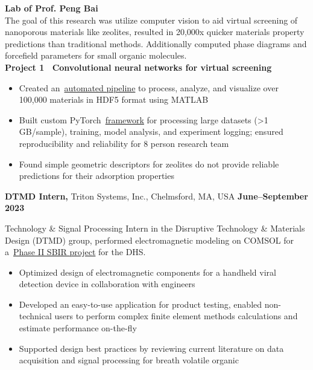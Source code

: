 \documentclass[margin,line]{res}
\begin{document}
\begin{resume}
	\begin{adjustwidth}{1.5em}{0pt}
		{\bf Lab of Prof. Peng Bai}\\
		The goal of this research was utilize computer vision to aid virtual
		screening of nanoporous materials like zeolites, resulted in 20,000x
		quicker materials property predictions than traditional methods.
		Additionally computed phase diagrams and forcefield parameters for small
		organic molecules.
		\\
		{\bf Project 1~\textendash{} Convolutional neural networks for virtual
		screening}
		\begin{itemize}
			\item Created
			      an~\href{https://github.com/samuelhoover/energy-grid-processing}{automated
				      pipeline} to process, analyze, and visualize over 100,000 materials in
			      HDF5 format using MATLAB
			\item Built custom
			      PyTorch~\href{https://github.com/samuelhoover/chan-ml}{framework}
			      for processing large datasets (>1 GB/sample), training, model
			      analysis, and experiment logging; ensured reproducibility and
			      reliability for 8 person research team
			\item Found simple geometric descriptors for zeolites do not provide
			      reliable predictions for their adsorption properties
		\end{itemize}
	\end{adjustwidth}
	{\bf DTMD Intern,} Triton Systems, Inc., Chelmsford, MA, USA
	\hfill {\bf June--September 2023}
	\begin{adjustwidth}{1.5em}{0pt}
		Technology \& Signal Processing Intern in the Disruptive Technology \&
		Materials Design (DTMD) group, performed electromagnetic modeling on COMSOL
		for a~\href{https://legacy.www.sbir.gov/sbirsearch/detail/2234557}{Phase II
			SBIR project} for the DHS.
		\begin{itemize}
			\item Optimized design of electromagnetic components for a handheld viral
			      detection device in collaboration with engineers
			\item Developed an easy-to-use application for product testing,
			      enabled non-technical users to perform complex finite element methods
			      calculations and estimate performance on-the-fly
			\item Supported design best practices by reviewing current literature on
			      data acquisition and signal processing for breath volatile organic

\end{itemize}
\end{adjustwidth}
\end{resume}
\end{document}
